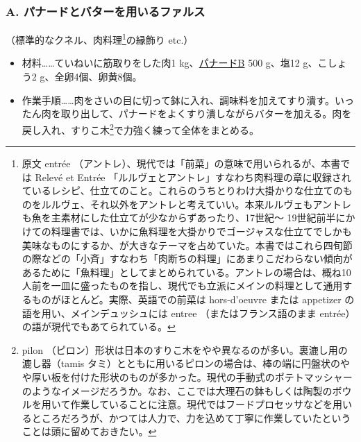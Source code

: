 \begin{recette}

\hypertarget{farce-a}{%
\subsubsection{A. パナードとバターを用いるファルス}\label{farce-a}}



（標準的なクネル、肉料理\footnote{原文 entrée
  （アントレ）、現代では「前菜」の意味で用いられるが、本書では Relevé et
  Entrée
  「ルルヴェとアントレ」すなわち肉料理の章に収録されているレシピ、仕立てのこと。これらのうちとりわけ大掛かりな仕立てのものをルルヴェ、それ以外をアントレと考えていい。本来ルルヴェもアントレも魚を主素材にした仕立てが少なからずあったり、17世紀〜
  19世紀前半にかけての料理書では、いかに魚料理を大掛かりでゴージャスな仕立てでしかも美味なものにするか、が大きなテーマを占めていた。本書ではこれら四旬節の際などの「小斉」すなわち「肉断ちの料理」にあまりこだわらない傾向があるために「魚料理」としてまとめられている。アントレの場合は、概ね10人前を一皿に盛ったものを指し、現代でも立派にメインの料理として通用するものがほとんど。実際、英語での前菜は
  hors-d'oeuvre または appetizer の語を用い、メインデュッシュには entree
  （またはフランス語のまま entrée）の語が現代でもあてられている。}の縁飾り
etc.）

\begin{itemize}
\item
  材料\ldots{}\ldots{}ていねいに筋取りをした肉1
  kg、\protect\hyperlink{panade-b}{パナードB} 500 g、塩12 g、こしょう2
  g、全卵4個、卵黄8個。
\item
  作業手順\ldots{}\ldots{}肉をさいの目に切って鉢に入れ、調味料を加えてすり潰す。いったん肉を取り出して、パナードをよくすり潰しながらバターを加える。肉を戻し入れ、すりこ木\footnote{pilon
    （ピロン）形状は日本のすりこ木をやや異なるのが多い。裏漉し用の漉し器（tamis
    タミ）とともに用いるピロンの場合は、棒の端に円盤状のやや厚い板を付けた形状のものが多かった。現代の手動式のポテトマッシャーのようなイメージだろうか。なお、ここでは大理石の鉢もしくは陶製のボウルを用いて作業していることに注意。現代ではフードプロセッサなどを用いるところだろうが、かつては人力で、力を込めて丁寧に作業していたということは頭に留めておきたい。}で力強く練って全体をまとめる。
\end{itemize}


\end{recette}
